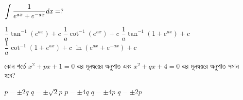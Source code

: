 \documentclass[addpoints]{exam}
\begin{document}
\begin{questions}
\question  $ \mathlarger{\int\dfrac{1}{e^{ax}+e^{-ax}}dx} = ?$

\begin{oneparchoices}
\choice $ \dfrac{1}{a}\tan^{-1}(e^{ax}) + c $
\choice $ \dfrac{1}{a}\cot^{-1}(e^{ax}) + c $
\choice $ \dfrac{1}{a}\tan^{-1}(1+e^{ax}) + c $
\choice $ \dfrac{1}{a}\cot^{-1}(1+e^{ax}) + c $
\choice $ \ln(e^{ax}+e^{-ax}) + c $
\end{oneparchoices}

\question  কোন শর্তে $ x^{2}+px+1=0 $ এর মূলদ্বয়ের অনুপাত এবং $ x^{2}+qx+4=0 $ এর মূলদ্বয়রে অনুপাত সমান হবে? 

\begin{oneparchoices}
\choice $ p =\pm 2q$
\choice $ q = \pm \sqrt{2}p $
\choice $ p = \pm 4q $
\choice $ q = \pm 4p $
\choice $ q = \pm 2p $
\end{oneparchoices}



\end{questions}
\end{document}
